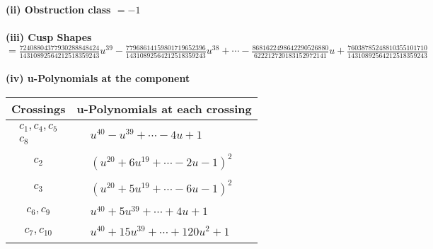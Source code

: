 \documentclass[1p]{elsarticle_modified}
\theoremstyle{definition}
\begin{document}
\flushleft \textbf{(ii) Obstruction class $= -1$}\\~\\
\flushleft \textbf{(iii) Cusp Shapes $= \frac{72408804377930288848424}{14310892564212518359243} u^{39}-\frac{77968614159801719652396}{14310892564212518359243} u^{38}+\cdots-\frac{8681622498642290526880}{622212720183152972141} u+\frac{76038785248810355101710}{14310892564212518359243}$}\\~\\
\newpage\renewcommand{\arraystretch}{1}
\flushleft \textbf{(iv) u-Polynomials at the component}\newline \\
\begin{tabular}{m{50pt}|m{274pt}}
Crossings & \hspace{64pt}u-Polynomials at each crossing \\
\hline $$\begin{aligned}c_{1},c_{4},c_{5}\\c_{8}\end{aligned}$$&$\begin{aligned}
&u^{40}- u^{39}+\cdots-4 u+1
\end{aligned}$\\
\hline $$\begin{aligned}c_{2}\end{aligned}$$&$\begin{aligned}
&(u^{20}+6 u^{19}+\cdots-2 u-1)^{2}
\end{aligned}$\\
\hline $$\begin{aligned}c_{3}\end{aligned}$$&$\begin{aligned}
&(u^{20}+5 u^{19}+\cdots-6 u-1)^{2}
\end{aligned}$\\
\hline $$\begin{aligned}c_{6},c_{9}\end{aligned}$$&$\begin{aligned}
&u^{40}+5 u^{39}+\cdots+4 u+1
\end{aligned}$\\
\hline $$\begin{aligned}c_{7},c_{10}\end{aligned}$$&$\begin{aligned}
&u^{40}+15 u^{39}+\cdots+120 u^2+1
\end{aligned}$\\
\hline
\end{tabular}\\~\\
\end{document}

